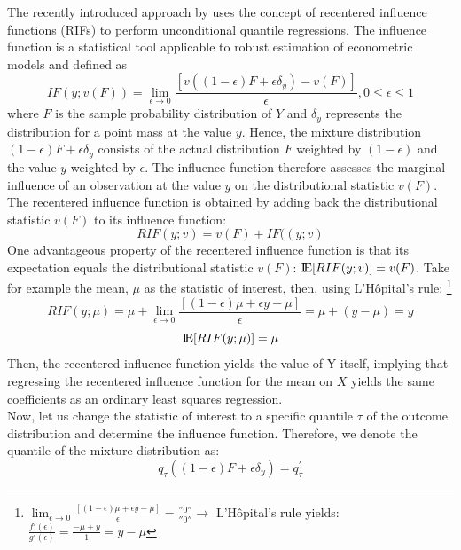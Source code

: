 The recently introduced approach by \cite{Firpo&Fortin&Lemieux:09} uses the concept of recentered influence functions (RIFs) to perform unconditional quantile regressions. The influence function is a statistical tool applicable to robust estimation of econometric models and defined as
\begin{equation}\label{8}
  IF(y;v(F))=\lim_{\epsilon \rightarrow 0}\frac{[v((1-\epsilon)F+\epsilon \delta_{y})-v(F)]}{\epsilon} , 0 \leq \epsilon \leq 1
\end{equation}
where $F$ is the sample probability distribution of $Y$ and $\delta_y$ represents the distribution for a point mass at the value $y$. Hence, the mixture distribution $(1-\epsilon)F + \epsilon \delta_{y}$ consists of the actual distribution $F$ weighted by $(1-\epsilon)$ and the value $y$ weighted by $\epsilon$. The influence function therefore assesses the marginal influence of an observation at the value $y$ on the distributional statistic $v(F)$. The recentered influence function is obtained by adding back the distributional statistic $v(F)$ to its influence function:
\begin{equation}\label{9}
  RIF(y;v)=v(F)+IF((y;v)
\end{equation}
One advantageous property of the recentered influence function is that its expectation equals the distributional statistic $v(F)$: $\mbox{I\negthinspace E}[RIF(y;v)]=v(F)$. Take for example the mean, $\mu$ as the statistic of interest, then, using L'H\^opital's rule: \footnote{ $\lim_{\epsilon \rightarrow 0}\frac{[(1-\epsilon)\mu + \epsilon y -\mu]}{\epsilon} = \frac{''0''}{''0''} \longrightarrow$ L'H\^opital's rule yields: $\frac{f'(\epsilon)}{g'(\epsilon)}=\frac{-\mu + y}{1}=y-\mu$}
\begin{equation}\label{10}
  RIF(y;\mu)=\mu + \lim_{\epsilon \rightarrow 0}\frac{[(1-\epsilon)\mu + \epsilon y -\mu]}{\epsilon}=\mu +(y-\mu)=y
\end{equation}
\begin{equation*}\label{11}
  \mbox{I\negthinspace E}[RIF(y;\mu)]=\mu
\end{equation*}
Then, the recentered influence function yields the value of Y itself, implying that regressing the recentered influence function for the mean on $X$ yields the same coefficients as an ordinary least squares regression.\\
Now, let us change the statistic of interest to a specific quantile $\tau$ of the outcome distribution and determine the influence function. Therefore, we denote the quantile of the mixture distribution as:
\begin{equation}\label{12}
  q_{\tau}((1-\epsilon)F+\epsilon \delta_{y})=q_{\tau}^{'}
\end{equation}
